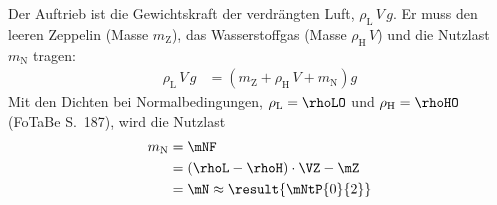 Der Auftrieb ist die Gewichtskraft der verdrängten Luft, $\rho_\text{L}\,V\,g$. Er muss den leeren Zeppelin (Masse $m_\text{Z}$), das Wasserstoffgas (Masse $\rho_\text{H}\,V$) und die Nutzlast $m_\text{N}$ tragen:
\begin{align}
 \rho_\text{L}\,V\,g &= \left(m_\text{Z} + \rho_\text{H}\,V + m_\text{N}\right)g
\end{align}
Mit den Dichten bei Normalbedingungen, $\rho_\text{L} = \rhoLO$ und $\rho_\text{H} = \rhoHO$ (FoTaBe S.~187), wird die Nutzlast
\begin{align}
 m_\text{N} &= \mNF \\
   &= \left(\rhoL-\rhoH\right)\cdot\VZ-\mZ \\
   &= \mN \approx \result{\mNtP{0}{2}}
\end{align}
